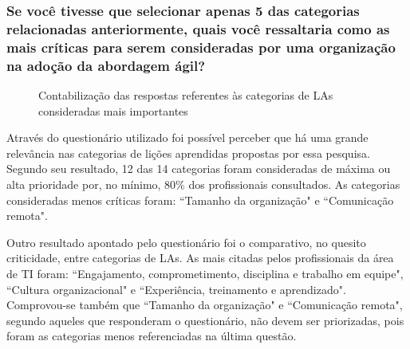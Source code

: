 \subsubsection{Se você tivesse que selecionar apenas 5 das categorias relacionadas anteriormente, quais você ressaltaria como as mais críticas para serem consideradas por uma organização na adoção da abordagem ágil?}

\begin{figure}[H]
	\centering
	\captionsetup{justification=centering}
	\caption{Contabilização das respostas referentes às categorias de LAs consideradas mais importantes}
	\label{fig:result-ranking}
\end{figure}

Através do questionário utilizado foi possível perceber que há uma grande relevância nas categorias de lições aprendidas propostas por essa pesquisa. Segundo seu resultado, 12 das 14 categorias foram consideradas de máxima ou alta prioridade por, no mínimo, 80\% dos profissionais consultados. As categorias consideradas menos críticas foram: ``Tamanho da organização" e ``Comunicação remota".

Outro resultado apontado pelo questionário foi o comparativo, no quesito criticidade, entre categorias de LAs. As mais citadas pelos profissionais da área de TI foram: ``Engajamento, comprometimento, disciplina e trabalho em equipe", ``Cultura organizacional" e ``Experiência, treinamento e aprendizado". Comprovou-se também que ``Tamanho da organização" e ``Comunicação remota", segundo aqueles que responderam o questionário, não devem ser priorizadas, pois foram as categorias menos referenciadas na última questão. 
